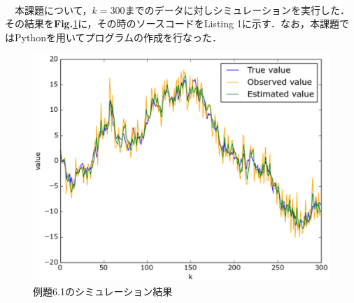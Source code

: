 \documentclass[a4paper,11pt]{jarticle}
\begin{document}
\vspace{2mm}\\
\ \ 本課題について，$ k = 300 $までのデータに対しシミュレーションを実行した．その結果を{\bf Fig.}\ref{fig:sim}に，その時のソースコードをListing 1に示す．なお，本課題ではPythonを用いてプログラムの作成を行なった．
\newpage
\begin{figure}[tb]
 \begin{center}
  \includegraphics[scale=0.9]{../figure/eps/sim.eps}
  \caption{例題6.1のシミュレーション結果}
  \label{fig:sim}
 \end{center}
\end{figure}
\end{document}
